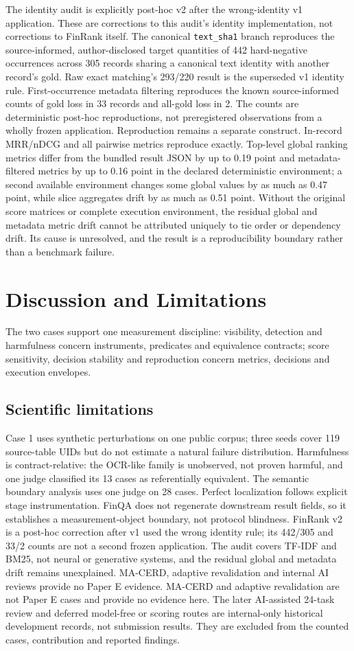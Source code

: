 \documentclass[10pt,conference]{IEEEtran}
\begin{document}
The identity audit is explicitly post-hoc v2 after the wrong-identity v1 application. These are corrections to this audit's identity implementation, not corrections to FinRank itself. The canonical \texttt{text\_sha1} branch reproduces the source-informed, author-disclosed target quantities of 442 hard-negative occurrences across 305 records sharing a canonical text identity with another record's gold. Raw exact matching's 293/220 result is the superseded v1 identity rule. First-occurrence metadata filtering reproduces the known source-informed counts of gold loss in 33 records and all-gold loss in 2. The counts are deterministic post-hoc reproductions, not preregistered observations from a wholly frozen application.
Reproduction remains a separate construct. In-record MRR/nDCG and all pairwise metrics reproduce exactly. Top-level global ranking metrics differ from the bundled result JSON by up to 0.19 point and metadata-filtered metrics by up to 0.16 point in the declared deterministic environment; a second available environment changes some global values by as much as 0.47 point, while slice aggregates drift by as much as 0.51 point. Without the original score matrices or complete execution environment, the residual global and metadata metric drift cannot be attributed uniquely to tie order or dependency drift. Its cause is unresolved, and the result is a reproducibility boundary rather than a benchmark failure.
\section{Discussion and Limitations}
The two cases support one measurement discipline: visibility, detection and harmfulness concern instruments, predicates and equivalence contracts; score sensitivity, decision stability and reproduction concern metrics, decisions and execution envelopes.
\subsection{Scientific limitations}
Case 1 uses synthetic perturbations on one public corpus; three seeds cover 119 source-table UIDs but do not estimate a natural failure distribution. Harmfulness is contract-relative: the OCR-like family is unobserved, not proven harmful, and one judge classified its 13 cases as referentially equivalent. The semantic boundary analysis uses one judge on 28 cases. Perfect localization follows explicit stage instrumentation. FinQA does not regenerate downstream result fields, so it establishes a measurement-object boundary, not protocol blindness.
FinRank v2 is a post-hoc correction after v1 used the wrong identity rule; its 442/305 and 33/2 counts are not a second frozen application. The audit covers TF-IDF and BM25, not neural or generative systems, and the residual global and metadata drift remains unexplained. MA-CERD, adaptive revalidation and internal AI reviews provide no Paper E evidence.
MA-CERD and adaptive revalidation are not Paper E cases and provide no evidence here. The later AI-assisted 24-task review and deferred model-free or scoring routes are internal-only historical development records, not submission results. They are excluded from the counted cases, contribution and reported findings.
\end{document}
